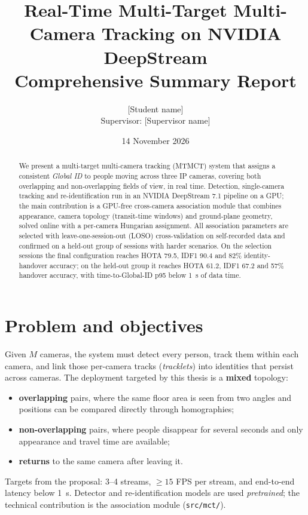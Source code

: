 \documentclass[11pt,a4paper]{article}
\title{Real-Time Multi-Target Multi-Camera Tracking on NVIDIA DeepStream\\[4pt]
\large Comprehensive Summary Report}
\author{[Student name] \\ Supervisor: [Supervisor name]}
\date{14 November 2026}
\begin{document}
\maketitle

\begin{abstract}
We present a multi-target multi-camera tracking (MTMCT) system that assigns a consistent
\emph{Global ID} to people moving across three IP cameras, covering both overlapping and
non-overlapping fields of view, in real time. Detection, single-camera tracking and
re-identification run in an NVIDIA DeepStream 7.1 pipeline on a GPU; the main contribution is
a GPU-free cross-camera association module that combines appearance, camera topology
(transit-time windows) and ground-plane geometry, solved online with a per-camera Hungarian
assignment. All association parameters are selected with leave-one-session-out (LOSO)
cross-validation on self-recorded data and confirmed on a held-out group of sessions with
harder scenarios. On the selection sessions the final configuration reaches HOTA 79.5,
IDF1 90.4 and 82\% identity-handover accuracy; on the held-out group it reaches HOTA 61.2,
IDF1 67.2 and 57\% handover accuracy, with time-to-Global-ID p95 below 1~s of data time.
\end{abstract}

\tableofcontents

\section{Problem and objectives}

Given $M$ cameras, the system must detect every person, track them within each camera, and
link those per-camera tracks (\emph{tracklets}) into identities that persist across cameras.
The deployment targeted by this thesis is a \textbf{mixed} topology:
\begin{itemize}
  \item \textbf{overlapping} pairs, where the same floor area is seen from two angles and
        positions can be compared directly through homographies;
  \item \textbf{non-overlapping} pairs, where people disappear for several seconds and only
        appearance and travel time are available;
  \item \textbf{returns} to the same camera after leaving it.
\end{itemize}
Targets from the proposal: 3--4 streams, $\geq 15$ FPS per stream, and end-to-end latency
below 1~s. Detector and re-identification models are used \emph{pretrained}; the technical
contribution is the association module (\texttt{src/mct/}).
\end{document}
